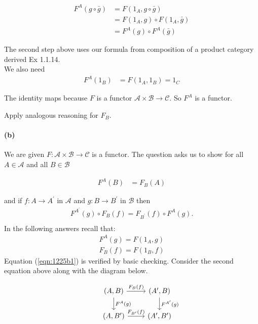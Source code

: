 \documentclass{article}
\begin{document}
\begin{align*}
  F^A(g \circ \bar{g})&= F(1_A, g \circ \bar{g})  \\
                           &= F(1_A,g) \circ F(1_A,\bar{g}) \\
                           &= F^A(g) \circ F^A(\bar{g})
\end{align*}

The second step above uses our formula from composition of a product category derived Ex 1.1.14. \\

We also need
\begin{align*}
F^A(1_B) &= F(1_A, 1_B) = 1_C
\end{align*}

The identity maps because $F$ is a functor $\mathcal{A} \times \mathcal{B} \rightarrow \mathcal{C}$. So $F^A$ is a functor.

Apply analogous reasoning for $F_B$.
\paragraph{(b)}

We are given $F: \mathcal{A} \times \mathcal{B} \rightarrow \mathcal{C}$ is a functor.
The question asks us to show for all $A \in \mathcal{A}$ and all $B \in \mathcal{B}$

\begin{align}
\label{eqn:1225b1}
  F^A(B) &= F_B(A)
\end{align}

and if $f: A \rightarrow A^{\prime}$ in $\mathcal{A}$ and $g: B \rightarrow B^\prime$ in
$\mathcal{B}$ then
\begin{align*}
F^{A^{\prime}}(g) \circ F_B(f) = F_{B^\prime}(f) \circ F^A(g). \\
\end{align*}
In the following answers recall that:
\begin{align*}
  F^A(g) = F(1_A, g) \\
  F_B(f) = F(1_B, f)
\end{align*}
Equation (\ref{eqn:1225b1}) is verified by basic checking. Consider the second equation above along with the diagram below.

\begin{equation}
\label{eqn:1225b2}
\begin{tikzcd}
  & (A,B) \arrow[d,"F^A(g)"] \arrow[r, "F_B(f)"] & (A',B) \arrow[d,"F^{A^{\prime}}(g)"{name=G,right}]\\
  & (A,B') \arrow[r,"F_{B^{\prime}}(f)"] & (A',B')
\end{tikzcd}
\end{equation}
\end{document}
